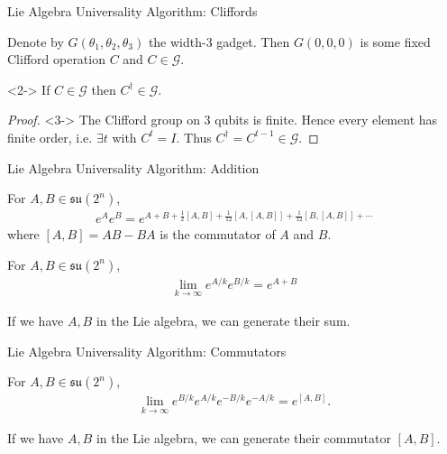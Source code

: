 \begin{frame}{Lie Algebra Universality Algorithm: Cliffords}

\begin{lemma}
Denote by $G(\theta_1, \theta_2, \theta_3)$ the width-3 gadget. Then $G(0,0,0)$ is some fixed Clifford operation $C$ and $C \in \mathcal{G}$. 
\end{lemma}

\begin{lemma}<2->
If $C \in \mathcal{G}$ then $C^\dagger \in \mathcal{G}$.
\end{lemma}

\begin{proof}<3->
The Clifford group on 3 qubits is finite. Hence every element has finite order, i.e. $\exists t$ with $C^t = I$. Thus $C^\dagger = C^{t-1} \in \mathcal{G}$.
\end{proof}

\end{frame}

\begin{frame}{Lie Algebra Universality Algorithm: Addition}

\begin{fact}
For $A,B \in \mathfrak{su}(2^n)$,
\begin{align}
    e^{A} e^{B} = e^{A + B + \frac{1}{2}[A,B] + \frac{1}{12}[A,[A,B]] + \frac{1}{12}[B,[A,B]] + \cdots}
\end{align}
where $[A,B] = AB - BA$ is the commutator of $A$ and $B$.
\end{fact}

\begin{fact}
For $A,B \in \mathfrak{su}(2^n)$,
\begin{align}
    \lim_{k \to \infty} e^{A/k} e^{B/k} = e^{A + B}
\end{align}
\end{fact}

\begin{corollary}
If we have $A,B$ in the Lie algebra, we can generate their sum.
\end{corollary}

\end{frame}

\begin{frame}{Lie Algebra Universality Algorithm: Commutators}

\begin{fact}
For $A,B \in \mathfrak{su}(2^n)$,
\begin{align}
    \lim_{k \to \infty} e^{B/k} e^{A/k} e^{-B/k} e^{-A/k} = e^{[A,B]}.
\end{align}
\end{fact}

\begin{corollary}
If we have $A,B$ in the Lie algebra, we can generate their commutator $[A,B]$.
\end{corollary}

\end{frame}

